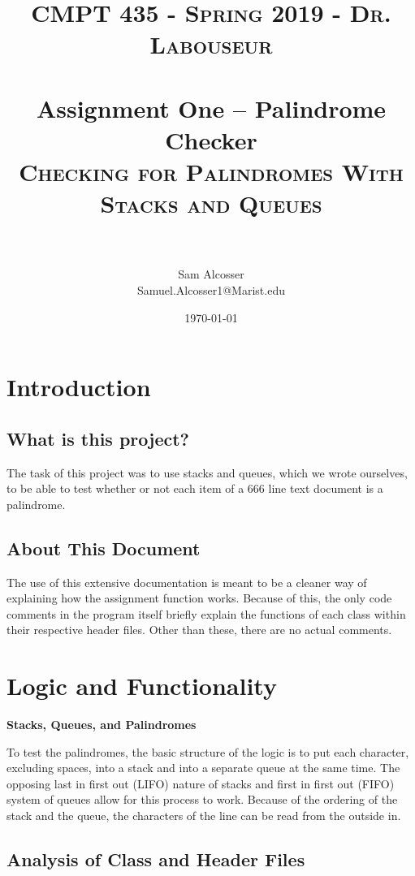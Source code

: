 \documentclass[letterpaper, 10pt]{article}
\title{	
   \normalfont \normalsize 
   \textsc{CMPT 435 - Spring 2019 - Dr. Labouseur} \\[10pt] %
   \horrule{0.5pt} \\[0.25cm] 	%
   \large{Assignment One -- Palindrome Checker} \\
   \textsc{Checking for Palindromes With Stacks and Queues}\\[20pt]%

   \horrule{0.5pt} \\[0.25cm] 	%
   
}
\author{Sam Alcosser \\ \normalsize Samuel.Alcosser1@Marist.edu}
\date{\normalsize\today}
\begin{document}
\selectfont
\maketitle
\tableofcontents
\newpage

\section{Introduction}
\subsection{What is this project?}

The task of this project was to use stacks and queues, which we wrote ourselves, to be able to test whether or not each item of a 666 line text document is a palindrome. 

\subsection{About This Document}

The use of this extensive documentation is meant to be a cleaner way of explaining how the assignment function works. Because of this, the only code comments in the program itself briefly explain the functions of each class within their respective header files. Other than these, there are no actual comments.

\section{Logic and Functionality}

\textbf{Stacks, Queues, and Palindromes}

To test the palindromes, the basic structure of the logic is to put each character, excluding spaces, into a stack and into a separate queue at the same time. The opposing last in first out (LIFO) nature of stacks and first in first out (FIFO) system of queues allow for this process to work. Because of the ordering of the stack and the queue, the characters of the line can be read from the outside in.




\subsection{Analysis of Class and Header Files}
\end{document}

